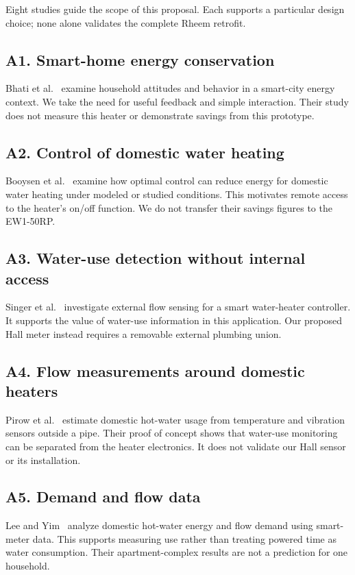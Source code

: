 Eight studies guide the scope of this proposal. Each supports a particular design choice; none alone validates the complete Rheem retrofit.

\subsection*{A1. Smart-home energy conservation}
Bhati et al.~\cite{bhati2017} examine household attitudes and behavior in a smart-city energy context. We take the need for useful feedback and simple interaction. Their study does not measure this heater or demonstrate savings from this prototype.

\subsection*{A2. Control of domestic water heating}
Booysen et al.~\cite{booysen2019} examine how optimal control can reduce energy for domestic water heating under modeled or studied conditions. This motivates remote access to the heater's on/off function. We do not transfer their savings figures to the EW1-50RP.

\subsection*{A3. Water-use detection without internal access}
Singer et al.~\cite{singer2017} investigate external flow sensing for a smart water-heater controller. It supports the value of water-use information in this application. Our proposed Hall meter instead requires a removable external plumbing union.

\subsection*{A4. Flow measurements around domestic heaters}
Pirow et al.~\cite{pirow2018} estimate domestic hot-water usage from temperature and vibration sensors outside a pipe. Their proof of concept shows that water-use monitoring can be separated from the heater electronics. It does not validate our Hall sensor or its installation.

\subsection*{A5. Demand and flow data}
Lee and Yim~\cite{lee2021} analyze domestic hot-water energy and flow demand using smart-meter data. This supports measuring use rather than treating powered time as water consumption. Their apartment-complex results are not a prediction for one household.

